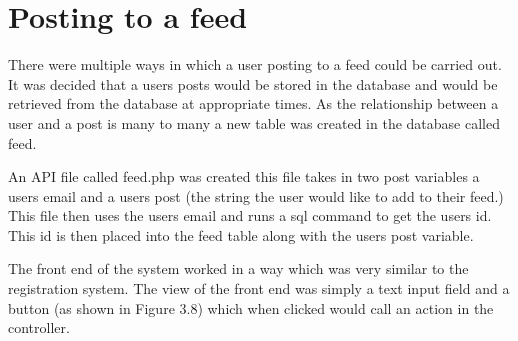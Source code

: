\section{Posting to a feed}
There were multiple ways in which a user posting to a feed could be carried out. It was decided that a users posts would be stored in the database and would be retrieved from the database at appropriate times. As the relationship between a user and a post is many to many a new table was created in the database called feed. 

An API file called feed.php was created this file takes in two post variables a users email and a users post (the string the user would like to add to their feed.) This file then uses the users email and runs a sql command to get the users id. This id is then placed into the feed table along with the users post variable.

The front end of the system worked in a way which was very similar to the registration system. The view of the front end was simply a text input field and a button (as shown in Figure 3.8) which when clicked would call an action in the controller.

